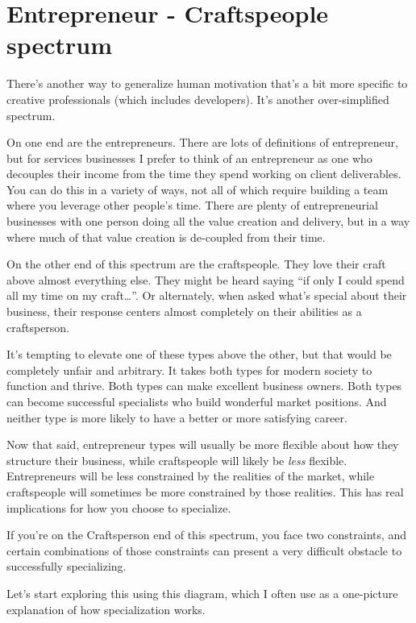 \section{Entrepreneur - Craftspeople spectrum}

There's another way to generalize human motivation that's a bit more specific to creative professionals (which includes developers). It's another over-simplified spectrum.

On one end are the entrepreneurs. There are lots of definitions of entrepreneur, but for services businesses I prefer to think of an entrepreneur as one who decouples their income from the time they spend working on client deliverables. You can do this in a variety of ways, not all of which require building a team where you leverage other people's time. There are plenty of entrepreneurial businesses with one person doing all the value creation and delivery, but in a way where much of that value creation is de-coupled from their time.

On the other end of this spectrum are the craftspeople. They love their craft above almost everything else. They might be heard saying ``if only I could spend all my time on my craft\ldots{}''. Or alternately, when asked what's special about their business, their response centers almost completely on their abilities as a craftsperson.

It's tempting to elevate one of these types above the other, but that would be completely unfair and arbitrary. It takes both types for modern society to function and thrive. Both types can make excellent business owners. Both types can become successful specialists who build wonderful market positions. And neither type is more likely to have a better or more satisfying career.

Now that said, entrepreneur types will usually be more flexible about how they structure their business, while craftspeople will likely be \emph{less} flexible. Entrepreneurs will be less constrained by the realities of the market, while craftspeople will sometimes be more constrained by those realities. This has real implications for how you choose to specialize.

If you're on the Craftsperson end of this spectrum, you face two constraints, and certain combinations of those constraints can present a very difficult obstacle to successfully specializing.

Let's start exploring this using this diagram, which I often use as a one-picture explanation of how specialization works.




